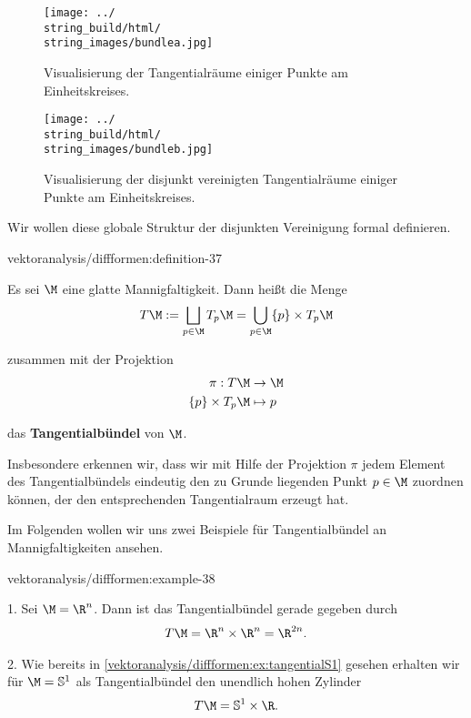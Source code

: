 \documentclass[letterpaper,10pt,english]{jupyterBook}
\begin{document}
\begin{figure}[htbp]
\centering


\noindent\texttt{[image: ../\\string\_build/html/\\string\_images/bundlea.jpg]}
\caption{Visualisierung der Tangentialräume einiger Punkte am Einheitskreises.}\label{\detokenize{vektoranalysis/diffformen:fig-bundlea}}\end{figure}

\begin{figure}[htbp]
\centering


\noindent\texttt{[image: ../\\string\_build/html/\\string\_images/bundleb.jpg]}
\caption{Visualisierung der disjunkt vereinigten Tangentialräume einiger Punkte am Einheitskreises.}\label{\detokenize{vektoranalysis/diffformen:fig-bundleb}}\end{figure}

\par
Wir wollen diese globale Struktur der disjunkten Vereinigung formal definieren.
\begin{definition}{}{vektoranalysis/diffformen:definition-37}



\par
Es sei \(\M\) eine glatte Mannigfaltigkeit.
Dann heißt die Menge
\begin{align*}
T\M := \bigsqcup_{p\in\M}  T_p\M = \bigcup_{p\in\M} \{p\} \times T_p\M
\end{align*}
\par
zusammen mit der Projektion
\begin{align*}
\pi:T\M &\to \M\\
\{p\}\times T_p\M &\mapsto p
\end{align*}
\par
das \textbf{Tangentialbündel} von \(\M\).
\end{definition}

\par
Insbesondere erkennen wir, dass wir mit Hilfe der Projektion \(\pi\) jedem Element des Tangentialbündels eindeutig den zu Grunde liegenden Punkt \(p\in\M\) zuordnen können, der den entsprechenden Tangentialraum erzeugt hat.

\par
Im Folgenden wollen wir uns zwei Beispiele für Tangentialbündel an Mannigfaltigkeiten ansehen.
\begin{example}{}{vektoranalysis/diffformen:example-38}





\par
1. Sei \(\M=\R^n\).
Dann ist das Tangentialbündel gerade gegeben durch
\begin{align*}
T\M = \R^n\times\R^n = \R^{2n}.
\end{align*}


\par
2. Wie bereits in \cref{vektoranalysis/diffformen:ex:tangentialS1} gesehen erhalten wir für \(\M=\mathbb{S}^1\) als Tangentialbündel den unendlich hohen Zylinder
\begin{align*}
T\M = \mathbb{S}^1\times \R.
\end{align*}\end{example}
\end{document}
